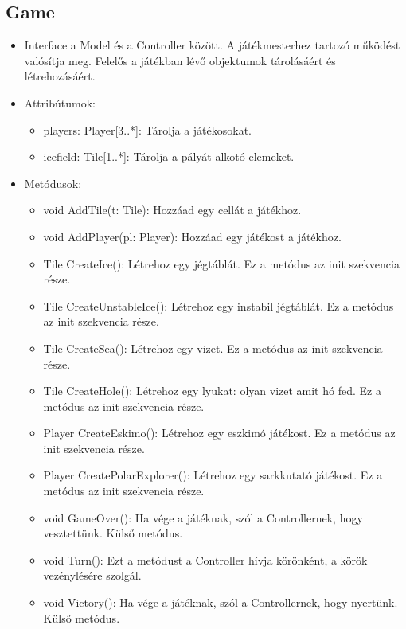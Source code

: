 \subsection{Game}
\begin{itemize}
	\item Interface a Model és a Controller között. A játékmesterhez tartozó működést valósítja meg. Felelős a játékban lévő objektumok tárolásáért és létrehozásáért.
	\item Attribútumok:
	\begin{itemize}
		\item players: Player[3..*]: Tárolja a játékosokat.
		\item icefield: Tile[1..*]: Tárolja a pályát alkotó elemeket.
	\end{itemize}
	\item Metódusok:
	\begin{itemize}
		\item void AddTile(t: Tile): Hozzáad egy cellát a játékhoz.
		\item void AddPlayer(pl: Player): Hozzáad egy játékost a játékhoz.
		\item Tile CreateIce(): Létrehoz egy jégtáblát. Ez a metódus az init szekvencia része.
		\item Tile CreateUnstableIce(): Létrehoz egy instabil jégtáblát. Ez a metódus az init szekvencia része.
		\item Tile CreateSea(): Létrehoz egy vizet. Ez a metódus az init szekvencia része.
		\item Tile CreateHole(): Létrehoz egy lyukat: olyan vizet amit hó fed. Ez a metódus az init szekvencia része.
		\item Player CreateEskimo(): Létrehoz egy eszkimó játékost. Ez a metódus az init szekvencia része.
		\item Player CreatePolarExplorer(): Létrehoz egy sarkkutató játékost. Ez a metódus az init szekvencia része.
		\item void GameOver(): Ha vége a játéknak, szól a Controllernek, hogy vesztettünk. Külső metódus.
		\item void Turn(): Ezt a metódust a Controller hívja körönként, a körök vezénylésére szolgál. 
		\item void Victory(): Ha vége a játéknak, szól a Controllernek, hogy nyertünk. Külső metódus.
	\end{itemize}
\end{itemize}

